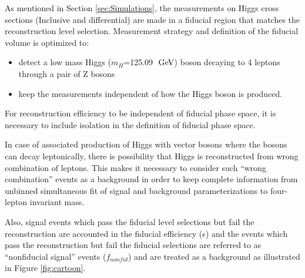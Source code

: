 As mentioned in Section \ref{sec:Simulations}, the measurements on Higgs cross sections (Inclusive and differential) are made in a fiducial region that matches the reconstruction level selection. %
Measurement strategy and definition of the fiducial volume is optimized to:
\begin{itemize}
	\item detect a low mass Higgs ($m_{H}$=125.09 $\hbox{$\;\hbox{\rm GeV}$}$) boson decaying to 4 leptons through a pair of Z bosons
	\item keep the measurements independent of how the Higgs boson is produced. 
\end{itemize}

For reconstruction efficiency to be independent of fiducial phase space, it is necessary to include isolation in the definition of fiducial phase space. %
\par
In case of associated production of Higgs with vector bosons where the bosons can decay leptonically, there is possibility that Higgs is reconstructed from wrong combination of leptons. 
This makes it necessary to consider such ``wrong combination'' events as a background in order to keep complete information from unbinned simultaneous fit of signal and background parameterizations to four-lepton invariant mass.
%
\par
Also, signal events which pass the fiducial level selections but fail the reconstruction are accounted  in the fiducial efficiency
($\epsilon$) and the events which pass the reconstruction but fail the fiducial selections are referred to as ``nonfiducial signal'' events ($f_{nonfid}$) and are treated as a background as illustrated in Figure \ref{fig:cartoon}. %


